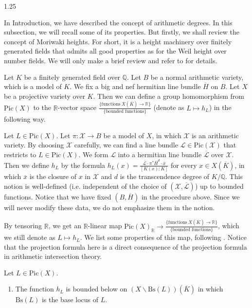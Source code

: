 \documentclass[12pt]{amsart}
\begin{document}
\begin{spacing}{1.25}
\ 

In Introduction, we have described the concept of arithmetic degrees. In this subsection, we will recall some of its properties. But firstly, we shall review the concept of Moriwaki heights. For short, it is a height machinery over finitely generated fields that admits all good properties as for the Weil height over number fields. We will only make a brief review and refer to \cite{Mor00} for details.

Let $K$ be a finitely generated field over $\mathbb{Q}$. Let $B$ be a normal arithmetic variety, which is a model of $K$. We fix a big and nef hermitian line bundle $\overline{H}$ on $B$. Let $X$ be a projective variety over $K$. Then we can define a group homomorphism from $\mathrm{Pic}(X)$ to the $\mathbb{R}$-vector space $\frac{\{\textrm{functions}\ X(\overline{K})\rightarrow\mathbb{R}\}}{\{\textrm{bounded functions}\}}$ (denote as $L\mapsto h_L$) in the following way.

Let $L\in\mathrm{Pic}(X)$. Let $\pi:\mathcal{X}\rightarrow B$ be a model of $X$, in which $\mathcal{X}$ is an arithmetic variety. By choosing $\mathcal{X}$ carefully, we can find a line bundle $\mathcal{L}\in\mathrm{Pic}(\mathcal{X})$ that restricts to $L\in\mathrm{Pic}(X)$. We form $\mathcal{L}$ into a hermitian line bundle $\overline{\mathcal{L}}$ over $\mathcal{X}$. Then we define $h_L$ by the formula $h_L(x)=\frac{\overline{\mathcal{L}}\cdot\pi^*\overline{H}^d\cdot\overline{x}}{[K(x):K]}$ for every $x\in X(\overline{K})$, in which $\overline{x}$ is the closure of $x$ in $\mathcal{X}$ and $d$ is the transcendence degree of $K/\mathbb{Q}$. This notion is well-defined (i.e. independent of the choice of $(\mathcal{X},\overline{\mathcal{L}})$) up to bounded functions. Notice that we have fixed $(B,\overline{H})$ in the procedure above. Since we will never modify these data, we do not emphasize them in the notion.

By tensoring $\mathbb{R}$, we get an $\mathbb{R}$-linear map $\mathrm{Pic}(X)_{\mathbb{R}}\rightarrow\frac{\{\textrm{functions}\ X(\overline{K})\rightarrow\mathbb{R}\}}{\{\textrm{bounded functions}\}}$, which we still denote as $L\mapsto h_L$. We list some properties of this map, following \cite[Proposition 3.3.7]{Mor00}. Notice that the projection formula here is a direct consequence of the projection formula in arithmetic intersection theory.

\begin{proposition}\label{Prop_ht}
Let $L\in\mathrm{Pic}(X)$.
\begin{enumerate}
\item
The function $h_L$ is bounded below on $(X\backslash\mathrm{Bs}(L))(\overline{K})$ in which $\mathrm{Bs}(L)$ is the base locus of $L$.


\end{enumerate}
\end{proposition}
\end{spacing}
\end{document}

